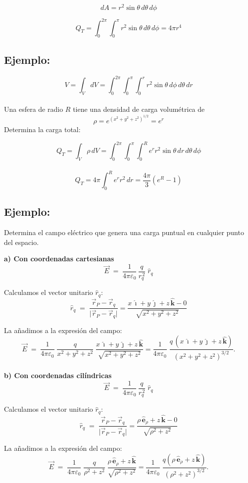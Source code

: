 \documentclass[a4paper,12pt]{article}
\begin{document}
\[
dA = r^{2}\sin\theta\, d\theta\, d\phi
\]

\[
Q_T = \int_{0}^{2\pi}\int_{0}^{\pi} r^{2}\sin\theta\, d\theta\, d\phi = 4\pi r^{4}
\]
\subsection*{Ejemplo:}
\[
V = \int_{V} dV = \int_{0}^{2\pi}\int_{0}^{\pi}\int_{0}^{r} r^{2}\sin\theta\, d\phi\, d\theta\, dr
\]\\
Una esfera de radio $R$ tiene una densidad de carga volumétrica de 
\[
\rho = e^{(x^{2}+y^{2}+z^{2})^{1/2}} = e^{r}
\]
Determina la carga total:

\[
Q_T = \int_{V} \rho\, dV = \int_{0}^{2\pi}\int_{0}^{\pi}\int_{0}^{R} e^{r} r^{2}\sin\theta\, dr\, d\theta\, d\phi
\]\\
\[
Q_T = 4\pi \int_{0}^{R} e^{r} r^{2}\, dr = \frac{4\pi}{3}\left(e^{R} - 1\right)
\]
\newpage
\noindent
\subsection*{Ejemplo:}
\noindent 
Determina el campo eléctrico que genera una carga puntual en cualquier punto del espacio.

\textbf{a) Con coordenadas cartesianas}
\[
\vec E \;=\; \frac{1}{4\pi\varepsilon_0}\,\frac{q}{r_q^{\,2}}\;\hat r_q
\]

Calculamos el vector unitario $\hat r_q$:
\[
\hat r_q \;=\; \frac{\vec r_P-\vec r_q}{\lvert \vec r_P-\vec r_q\rvert}
= \frac{x\,\hat{\imath}+y\,\hat{\jmath}+z\,\hat{\mathbf k}-0}{\sqrt{x^{2}+y^{2}+z^{2}}}
\]

La añadimos a la expresión del campo:
\[
\vec E \;=\; \frac{1}{4\pi\varepsilon_0}\;
\frac{q}{x^{2}+y^{2}+z^{2}}\;
\frac{x\,\hat{\imath}+y\,\hat{\jmath}+z\,\hat{\mathbf k}}{\sqrt{x^{2}+y^{2}+z^{2}}}
= \frac{1}{4\pi\varepsilon_0}\;
\frac{q\,(x\,\hat{\imath}+y\,\hat{\jmath}+z\,\hat{\mathbf k})}{(x^{2}+y^{2}+z^{2})^{3/2}}.
\]\\

\textbf{b) Con coordenadas cilíndricas}
\[
\vec E \;=\; \frac{1}{4\pi\varepsilon_0}\,\frac{q}{r_q^{\,2}}\;\hat r_q
\]

Calculamos el vector unitario $\hat r_q$:
\[
\hat r_q \;=\; \frac{\vec r_P-\vec r_q}{\lvert \vec r_P-\vec r_q\rvert}
= \frac{\rho\,\hat{\mathbf e}_\rho + z\,\hat{\mathbf k}-0}{\sqrt{\rho^{2}+z^{2}}}
\]

La añadimos a la expresión del campo:
\[
\vec E \;=\; \frac{1}{4\pi\varepsilon_0}\;
\frac{q}{\rho^{2}+z^{2}}\;
\frac{\rho\,\hat{\mathbf e}_\rho + z\,\hat{\mathbf k}}{\sqrt{\rho^{2}+z^{2}}}
= \frac{1}{4\pi\varepsilon_0}\;
\frac{q\left(\rho\,\hat{\mathbf e}_\rho + z\,\hat{\mathbf k}\right)}{(\rho^{2}+z^{2})^{3/2}}.
\]\\
\end{document}

